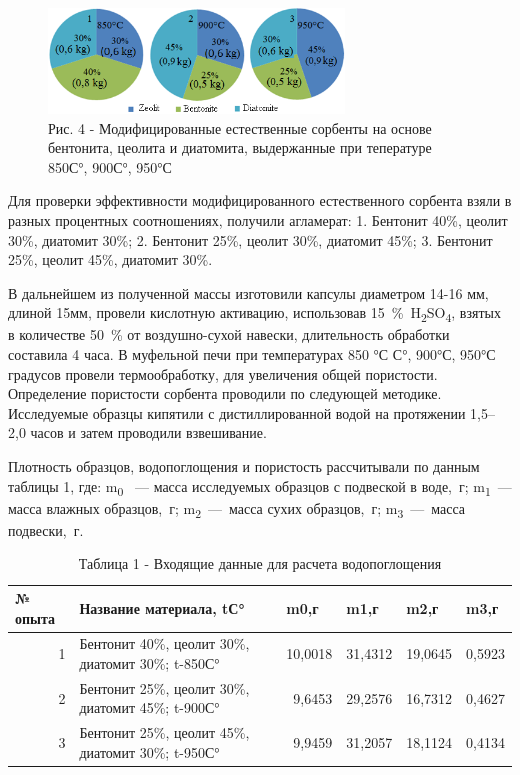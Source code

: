 \begin{figure}[H]
	\centering
	\includegraphics[width=0.7\textwidth]{media/chem/image4}
	\caption*{Рис. 4 - Модифицированные естественные сорбенты на
основе бентонита, цеолита и диатомита, выдержанные при тепературе 850С°,
900С°, 950°С}
\end{figure}

\begin{multicols}{2}
Для проверки эффективности модифицированного естественного сорбента
взяли в разных процентных соотношениях, получили агламерат: 1. Бентонит
40\%, цеолит 30\%, диатомит 30\%; 2. Бентонит 25\%, цеолит 30\%,
диатомит 45\%; 3. Бентонит 25\%, цеолит 45\%, диатомит 30\%.

В дальнейшем из полученной массы изготовили капсулы диаметром 14-16 мм,
длиной 15мм, провели кислотную активацию, использовав
15~\%~H\textsubscript{2}SO\textsubscript{4}, взятых в количестве 50~\%
от воздушно-сухой навески, длительность обработки составила 4 часа. В
муфельной печи при температурах 850 °С С°, 900°С, 950°С градусов провели
термообработку, для увеличения общей пористости. Определение пористости
сорбента проводили по следующей методике. Исследуемые образцы кипятили с
дистиллированной водой на протяжении 1,5--2,0 часов и затем проводили
взвешивание.

Плотность образцов, водопоглощения и пористость рассчитывали по данным
таблицы 1, где: m\textsubscript{0} ~--- масса исследуемых образцов с
подвеской в воде,~г; m\textsubscript{1}~--- масса влажных образцов,~г;
m\textsubscript{2}~---~масса сухих образцов,~г;
m\textsubscript{3}~---~масса подвески,~г.
\end{multicols}

\begin{table}[H]
\caption*{Таблица 1 - Входящие данные для расчета водопоглощения}
\centering
\begin{tabular}{|r|p{}|r|r|r|r|}
\hline
\multicolumn{1}{|l|}{№ опыта} & Название материала, tС° & \multicolumn{1}{l|}{m0,г} & \multicolumn{1}{l|}{m1,г} & \multicolumn{1}{l|}{m2,г} & \multicolumn{1}{l|}{m3,г} \\ \hline
1 & Бентонит 40\%, цеолит 30\%, диатомит 30\%; t-850С° & 10,0018 & 31,4312 & 19,0645 & 0,5923 \\ \hline
2 & Бентонит 25\%, цеолит 30\%, диатомит 45\%; t-900С° & 9,6453  & 29,2576 & 16,7312 & 0,4627 \\ \hline
3 & Бентонит 25\%, цеолит 45\%, диатомит 30\%; t-950С° & 9,9459  & 31,2057 & 18,1124 & 0,4134 \\ \hline
\end{tabular}
\end{table}

